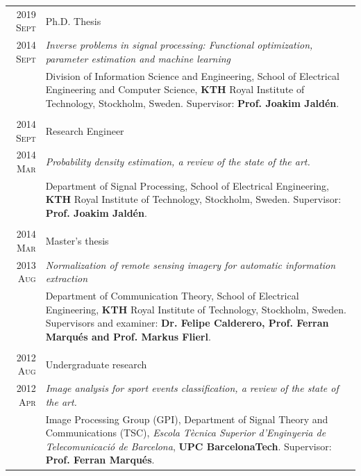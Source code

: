 \documentclass[a4paper,10pt]{article}
\begin{document}
    \begin{tabular}{r|p{13cm}}
    
      \textsc{2019 Sept} 	& Ph.D. Thesis \\
      \textsc{2014 Sept} 	& \emph{Inverse problems in signal processing: Functional optimization, parameter estimation and machine learning} \\
				& \footnotesize{ Division of Information Science and Engineering, School of Electrical Engineering and Computer Science,
				  \textbf{KTH} Royal Institute of Technology, Stockholm, Sweden. Supervisor: \textbf{Prof. Joakim Jald\'{e}n}. 
				  } \\
      \multicolumn{2}{c}{} \\

      \textsc{2014 Sept} 	& Research Engineer \\
      \textsc{2014 Mar} 	& \emph{Probability density estimation, a review of the state of the art.} \\ 
				& \footnotesize{Department of Signal Processing, School of Electrical Engineering,
				  \textbf{KTH} Royal Institute of Technology, Stockholm, Sweden. Supervisor: \textbf{Prof. Joakim Jald\'{e}n}.} \\
      \multicolumn{2}{c}{} \\

      \textsc{2014 Mar} 	& Master's thesis \\
      \textsc{2013 Aug} 	& \emph{ Normalization of remote sensing imagery for automatic information extraction } \\ 
				& \footnotesize{Department of Communication Theory, School of Electrical Engineering,
				  \textbf{KTH} Royal Institute of Technology, Stockholm, Sweden. Supervisors and examiner: \textbf{Dr. Felipe Calderero, Prof. Ferran Marqu\'{e}s and Prof. Markus Flierl}.} \\
      \multicolumn{2}{c}{} \\


      \textsc{2012 Aug} 	& Undergraduate research \\
      \textsc{2012 Apr} 	& \emph{Image analysis for sport events classification, a review of the state of the art.} \\ 
				& \footnotesize{Image Processing Group (GPI), Department of Signal Theory and 
				  Communications (TSC), \emph{Escola T\`{e}cnica Superior d'Enginyeria de Telecomunicaci\'{o} 
				  de Barcelona}, \textbf{UPC BarcelonaTech}. Supervisor: \textbf{Prof. Ferran Marqu\'{e}s}.} \\

    \end{tabular}
\end{document}
